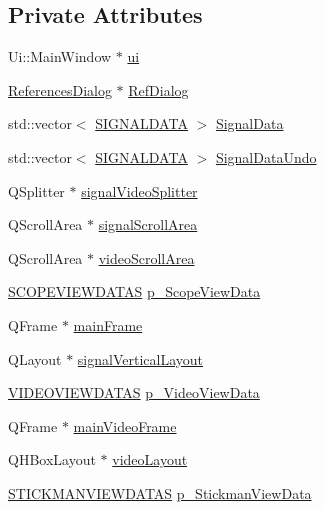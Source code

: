 \subsection*{Private Attributes}
\begin{CompactItemize}
\item 
Ui::MainWindow $\ast$ \hyperlink{class_main_window_35466a70ed47252a0191168126a352a5}{ui}
\item 
\hyperlink{class_references_dialog}{ReferencesDialog} $\ast$ \hyperlink{class_main_window_c84757d65927ad5b3d3fed922a92c37b}{RefDialog}
\item 
std::vector$<$ \hyperlink{class_s_i_g_n_a_l_d_a_t_a}{SIGNALDATA} $>$ \hyperlink{class_main_window_efbc5f06514ef2f41b887afed5502561}{SignalData}
\item 
std::vector$<$ \hyperlink{class_s_i_g_n_a_l_d_a_t_a}{SIGNALDATA} $>$ \hyperlink{class_main_window_9bb84329eb6036edb4c1aeadb20dd328}{SignalDataUndo}
\item 
QSplitter $\ast$ \hyperlink{class_main_window_8efbb42d22e1edb33ee226282254c729}{signalVideoSplitter}
\item 
QScrollArea $\ast$ \hyperlink{class_main_window_c0034ba9f0b34d5311b8f88e31652ed1}{signalScrollArea}
\item 
QScrollArea $\ast$ \hyperlink{class_main_window_3f6296371b3123678d1615633f5debfb}{videoScrollArea}
\item 
\hyperlink{data_8h_f7e132dec2dc7ae40c113b1d6992a0fb}{SCOPEVIEWDATAS} \hyperlink{class_main_window_f790693a8d5c2265deac3c3b952e015a}{p\_\-ScopeViewData}
\item 
QFrame $\ast$ \hyperlink{class_main_window_cdf5ffc1a33f033ad970b1ebebbf948c}{mainFrame}
\item 
QLayout $\ast$ \hyperlink{class_main_window_9c8a0ae3adc3ea27e4d930a2bd52913d}{signalVerticalLayout}
\item 
\hyperlink{data_8h_3df722f793b1c61957af5906c5ac4e92}{VIDEOVIEWDATAS} \hyperlink{class_main_window_008d69c8bb36dbaf4749d19dac862e22}{p\_\-VideoViewData}
\item 
QFrame $\ast$ \hyperlink{class_main_window_cc9b5ed3ab3975b5567206227ebeb8d6}{mainVideoFrame}
\item 
QHBoxLayout $\ast$ \hyperlink{class_main_window_192f31864be0fbc5eb29b8a8b51f3da1}{videoLayout}
\item 
\hyperlink{data_8h_72163597ee460eb79571f264074618e7}{STICKMANVIEWDATAS} \hyperlink{class_main_window_d4e41631cc6d9f70349d11bd32c1ef77}{p\_\-StickmanViewData}
\item 

\end{CompactItemize}
